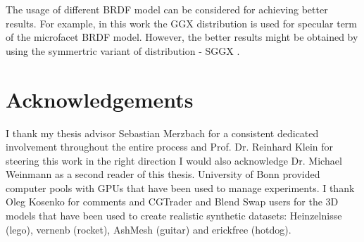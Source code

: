 The usage of different BRDF model can be considered for achieving better results.
For example, in this work the GGX distribution \cite{walter2007microfacet}
is used for specular term of the microfacet BRDF model.
However, the better results might be obtained by using the symmertric variant of distribution - SGGX \cite{heitz2015sggx}.



\section{Acknowledgements}

I thank my thesis advisor Sebastian Merzbach for a consistent dedicated involvement throughout the entire process
and Prof. Dr. Reinhard Klein for steering this work in the right direction
\textit{}
I would also acknowledge Dr. Michael Weinmann as a second reader of this thesis.
University of Bonn provided computer pools with GPUs that have been used to manage experiments.
I thank Oleg Kosenko for comments
and CGTrader and Blend Swap users for the 3D models
that have been used to create realistic synthetic datasets:
Heinzelnisse (lego), vernenb (rocket), AshMesh (guitar) and erickfree (hotdog).

